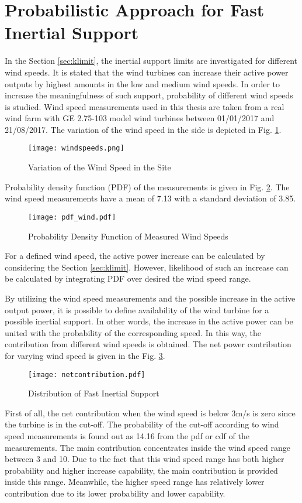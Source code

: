 \section{Probabilistic Approach for Fast Inertial Support}
In the Section \ref{sec:klimit}, the inertial support limits are investigated for different wind speeds. It is stated that the wind turbines can increase their active power outputs by highest amounts in the low and medium wind speeds. In order to increase the meaningfulness of such support, probability of different wind speeds is studied. Wind speed measurements used in this thesis are taken from a real wind farm with GE 2.75-103 model wind turbines between 01/01/2017 and 21/08/2017. The variation of the wind speed in the side is depicted in Fig. \ref{windvariation}.\par
\begin{figure}[h!]
	\centering
	\texttt{[image: windspeeds.png]}
	\caption{Variation of the Wind Speed in the Site}
	\label{windvariation}
\end{figure}
Probability density function (PDF) of the measurements is given in Fig. \ref{windpdf}. The wind speed measurements have a mean of 7.13 with a standard deviation of 3.85.\par
\begin{figure}[h!]
	\centering
	\texttt{[image: pdf\_wind.pdf]}
	\caption{Probability Density Function of Measured Wind Speeds}
	\label{windpdf}
\end{figure}
For a defined wind speed, the active power increase can be calculated by considering the Section \ref{sec:klimit}. However, likelihood of such an increase can be calculated by integrating PDF over desired the wind speed range.\par
By utilizing the wind speed measurements and the possible increase in the active output power, it is possible to define availability of the wind turbine for a possible inertial support. In other words, the increase in the active power can be united with the probability of the corresponding speed. In this way, the contribution from different wind speeds is obtained. The net power contribution for varying wind speed is given in the Fig. \ref{net_contribution}.\par
\begin{figure}[h!]
	\centering
	\texttt{[image: netcontribution.pdf]}
	\caption{Distribution of Fast Inertial Support}
	\label{net_contribution}
\end{figure}
First of all, the net contribution when the wind speed is below 3m/s is zero since the turbine is in the cut-off. The probability of the cut-off according to wind speed measurements is found out as 14.16 from the pdf or cdf of the measurements. The main contribution concentrates inside the wind speed range between 3 and 10. Due to the fact that this wind speed range has both higher probability and higher increase capability, the main contribution is provided inside this range. Meanwhile, the higher speed range has relatively lower contribution due to its lower probability and lower capability. \par
